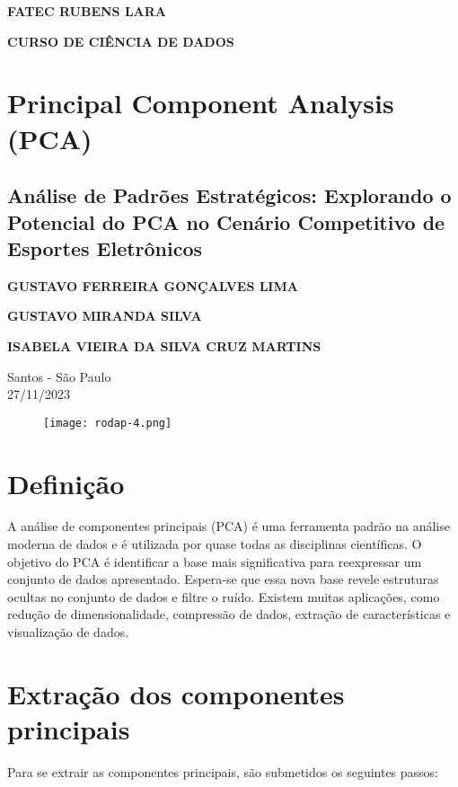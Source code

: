 \documentclass[a4paper,12pt]{article}
\begin{document}
\begin{center}
\textbf{FATEC RUBENS LARA}

\textbf{CURSO DE CIÊNCIA DE DADOS}

\vspace{3cm}

\section*{Principal Component Analysis (PCA)}
\subsection*{Análise de Padrões Estratégicos: Explorando o Potencial do PCA no Cenário Competitivo de Esportes Eletrônicos}



\vspace{3cm}

\textbf{GUSTAVO FERREIRA GONÇALVES LIMA}

\textbf{GUSTAVO MIRANDA SILVA}

\textbf{ISABELA VIEIRA DA SILVA CRUZ MARTINS}





\vfill

\begin{flushright}
Santos - São Paulo\\
27/11/2023
\end{flushright}
\end{center}
\begin{figure}{}
\centering
\label{}
\texttt{[image: rodap-4.png]}
\end{figure}
\pagebreak

\section{Definição}
A análise de componentes principais (PCA) é uma ferramenta padrão na análise moderna de dados e é utilizada por quase todas as disciplinas científicas. O objetivo do PCA é identificar a base mais significativa para reexpressar um conjunto de dados apresentado. Espera-se que essa nova base revele estruturas ocultas no conjunto de dados e filtre o ruído. Existem muitas aplicações, como redução de dimensionalidade, compressão de dados, extração de características e visualização de dados.
\section{Extração dos componentes principais}
Para se extrair as componentes principais, são submetidos os seguintes passos:
\end{document}
